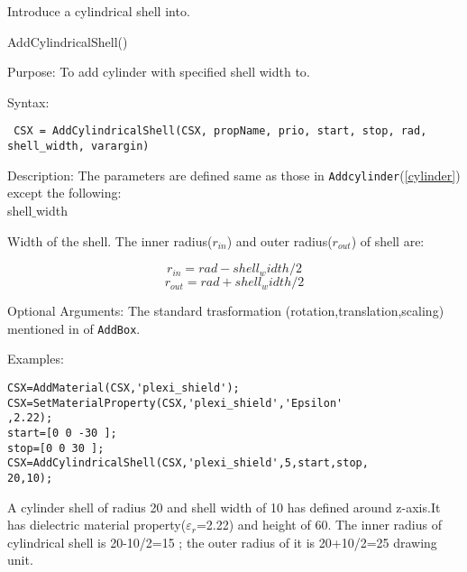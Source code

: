 Introduce a cylindrical shell into\hyperref[CSX]{}. 

\begin{FontNameFunct}{AddCylindricalShell()}
\end{FontNameFunct}


\begin{FontDescr}{Purpose:}
To add cylinder with specified shell width to\hyperref[CSX]{}. 
\end{FontDescr}

\begin{FontDescr}{Syntax:}
\begin{lstlisting} 
 CSX = AddCylindricalShell(CSX, propName, prio, start, stop, rad, shell_width, varargin)
\end{lstlisting}
\end{FontDescr}

\begin{FontDescr}{Description:}
The parameters are defined same as those in \texttt{Addcylinder}(\ref{cylinder}) except the following: \\
\textcolor{varcol}{shell$\_$width}
\begin{myindentpar} Width of the shell. The inner radius($r_{in}$) and outer radius($r_{out}$) of shell are:

\begin{equation}    
r_{in}=rad-shell_width/2 
\end{equation}
\label{rin}
\begin{equation}
r_{out}=rad+shell_width/2 
\end{equation}
\label{rout}

\end{myindentpar} 

\end{FontDescr}

\begin{FontDescr}{Optional Arguments:}
The standard trasformation (rotation,translation,scaling) mentioned in  \hyperref[prim_transform]{} of \texttt{AddBox}.   
\end{FontDescr}

\begin{FontDescr}{Examples:}

\begin{lstlisting} 
CSX=AddMaterial(CSX,'plexi_shield');
CSX=SetMaterialProperty(CSX,'plexi_shield','Epsilon'
,2.22);
start=[0 0 -30 ];
stop=[0 0 30 ];
CSX=AddCylindricalShell(CSX,'plexi_shield',5,start,stop,
20,10);
\end{lstlisting}
A cylinder shell of radius 20 and shell width of 10 has defined around z-axis.It has dielectric material property($\varepsilon_{r}$=2.22) and height of 60. The inner radius of cylindrical shell is 20-10/2=15 ; the outer radius of it is 20+10/2=25 drawing unit.    
\end{FontDescr}

